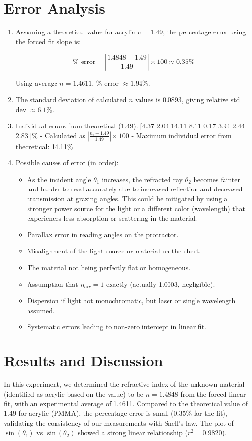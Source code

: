 \documentclass[12pt, a4paper]{article}
\begin{document}
\section{Error Analysis}
\begin{enumerate}
\item Assuming a theoretical value for acrylic $n = 1.49$, the percentage error using the forced fit slope is:

\[ \% \text{ error} = \left| \frac{1.4848 - 1.49}{1.49} \right| \times 100 \approx 0.35\% \]

Using average $n=1.4611$, \% error $\approx 1.94\%$.

\item The standard deviation of calculated $n$ values is 0.0893, giving relative std dev $\approx 6.1\%$.

\item Individual errors from theoretical (1.49): [4.37 2.04 14.11 8.11 0.17 3.94 2.44 2.83 ]\%
  - Calculated as $\left| \frac{n_i - 1.49}{1.49} \right| \times 100$
  - Maximum individual error from theoretical: 14.11\%

\item Possible causes of error (in order):
\begin{itemize}
\item As the incident angle $\theta_1$ increases, the refracted ray $\theta_2$ becomes fainter and harder to read accurately due to increased reflection and decreased transmission at grazing angles. This could be mitigated by using a stronger power source for the light or a different color (wavelength) that experiences less absorption or scattering in the material.
\item Parallax error in reading angles on the protractor.
\item Misalignment of the light source or material on the sheet.
\item The material not being perfectly flat or homogeneous.
\item Assumption that $n_{air} = 1$ exactly (actually 1.0003, negligible).
\item Dispersion if light not monochromatic, but laser or single wavelength assumed.
\item Systematic errors leading to non-zero intercept in linear fit.
\end{itemize}
\end{enumerate}

\section{Results and Discussion}
In this experiment, we determined the refractive index of the unknown material (identified as acrylic based on the value) to be $n = 1.4848$ from the forced linear fit, with an experimental average of 1.4611. Compared to the theoretical value of 1.49 for acrylic (PMMA), the percentage error is small (0.35\% for the fit), validating the consistency of our measurements with Snell's law. The plot of $\sin(\theta_1)$ vs $\sin(\theta_2)$ showed a strong linear relationship ($r^2 = 0.9820$).
\end{document}
